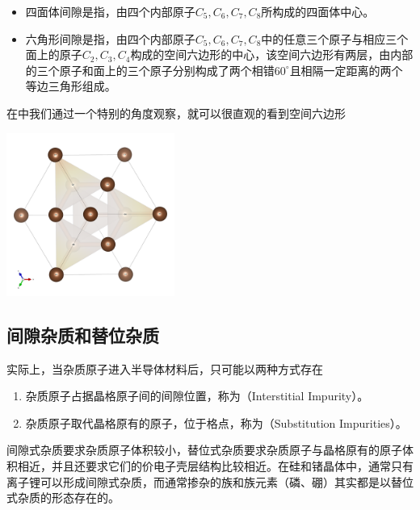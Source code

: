 \begin{itemize}
    \item 四面体间隙是指，由四个内部原子$C_5,C_6,C_7,C_8$所构成的四面体中心。
    \item 六角形间隙是指，由四个内部原子$C_5,C_6,C_7,C_8$中的任意三个原子与相应三个面上的原子$C_2,C_3,C_4$构成的空间六边形的中心，该空间六边形有两层，由内部的三个原子和面上的三个原子分别构成了两个相错$60^{\circ}$且相隔一定距离的两个等边三角形组成。
\end{itemize}
在中我们通过一个特别的角度观察，就可以很直观的看到空间六边形
\begin{Figure}[金刚石结构中的空间六角形]
    \includegraphics[width=5.5cm]{image/Diamond_HEX.png}
\end{Figure}

\subsection{间隙杂质和替位杂质}

实际上，当杂质原子进入半导体材料后，只可能以两种方式存在
\begin{enumerate}
    \item 杂质原子占据晶格原子间的间隙位置，称为（Interstitial Impurity）。
    \item 杂质原子取代晶格原有的原子，位于格点，称为（Substitution Impurities）。
\end{enumerate}
间隙式杂质要求杂质原子体积较小，替位式杂质要求杂质原子与晶格原有的原子体积相近，并且还要求它们的价电子壳层结构比较相近。在硅和锗晶体中，通常只有离子锂可以形成间隙式杂质，而通常掺杂的族和族元素（磷、硼）其实都是以替位式杂质的形态存在的。

